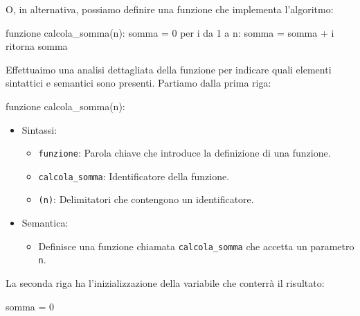 \documentclass[
  letterpaper,
]{scrbook}
\newenvironment{Shaded}{\begin{snugshade}}{\end{snugshade}}
\newcommand{\NormalTok}[1]{\textcolor[rgb]{0.00,0.23,0.31}{#1}}
\providecommand{\tightlist}{%
  \setlength{\itemsep}{0pt}\setlength{\parskip}{0pt}}\usepackage{longtable,booktabs,array}
\begin{document}
O, in alternativa, possiamo definire una funzione che implementa
l'algoritmo:

\begin{Shaded}
\begin{Highlighting}[]
\NormalTok{funzione calcola\_somma(n):}
\NormalTok{  somma = 0}
\NormalTok{  per i da 1 a n:}
\NormalTok{    somma = somma + i}
\NormalTok{  ritorna somma}
\end{Highlighting}
\end{Shaded}

Effettuaimo una analisi dettagliata della funzione per indicare quali
elementi sintattici e semantici sono presenti. Partiamo dalla prima
riga:

\begin{Shaded}
\begin{Highlighting}[]
\NormalTok{funzione calcola\_somma(n):}
\end{Highlighting}
\end{Shaded}

\begin{itemize}
\tightlist
\item
  Sintassi:

  \begin{itemize}
  \tightlist
  \item
    \texttt{funzione}: Parola chiave che introduce la definizione di una
    funzione.
  \item
    \texttt{calcola\_somma}: Identificatore della funzione.
  \item
    \texttt{(n)}: Delimitatori che contengono un identificatore.
  \end{itemize}
\item
  Semantica:

  \begin{itemize}
  \tightlist
  \item
    Definisce una funzione chiamata \texttt{calcola\_somma} che accetta
    un parametro \texttt{n}.
  \end{itemize}
\end{itemize}

La seconda riga ha l'inizializzazione della variabile che conterrà il
risultato:

\begin{Shaded}
\begin{Highlighting}[]
\NormalTok{somma = 0}
\end{Highlighting}
\end{Shaded}
\end{document}

